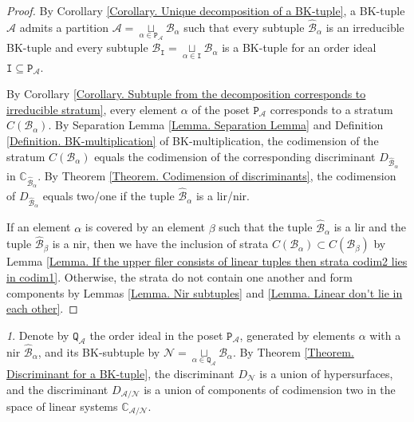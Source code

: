 \documentclass[11pt]{article}
\theoremstyle{plain}
\theoremstyle{definition}
\theoremstyle{remark}
\newtheorem{rem}[thm]{\protect\remarkname}
\theoremstyle{plain}
\theoremstyle{plain}
\theoremstyle{plain}
\theoremstyle{definition}
\providecommand{\remarkname}{Remark}
\begin{document}
\begin{proof}
By Corollary \ref{Corollary. Unique decomposition of a BK-tuple},
a BK-tuple $\mathscr{A}$ admits a partition $\mathscr{A}=\underset{\alpha\in\mathtt{P}_{\mathscr{A}}}{\sqcup}\mathscr{B}_{\alpha}$
such that every subtuple $\hat{\mathscr{B}}_{\alpha}$ is an irreducible
BK-tuple and every subtuple $\mathscr{B}_{\mathtt{I}}=\underset{\alpha\in\mathtt{I}}{\sqcup}\mathscr{B}_{\alpha}$
is a BK-tuple for an order ideal $\mathtt{I}\subseteq\mathtt{P}_{\mathscr{A}}$. 

By Corollary \ref{Corollary. Subtuple from the decomposition corresponds to irreducible stratum},
every element $\alpha$ of the poset $\mathtt{P}_{\mathscr{A}}$ corresponds
to a stratum $C(\mathscr{B}_{\alpha}).$ By Separation Lemma \ref{Lemma. Separation Lemma}
and Definition \ref{Definition. BK-multiplication} of BK-multiplication,
the codimension of the stratum $C(\mathscr{B}_{\alpha})$ equals the
codimension of the corresponding discriminant $D_{\hat{\mathscr{B}}_{\alpha}}$
in $\mathbb{C}_{\hat{\mathscr{B}}_{\alpha}}$. By Theorem \ref{Theorem. Codimension of discriminants},
the codimension of $D_{\hat{\mathscr{B}}_{\alpha}}$ equals two/one
if the tuple $\hat{\mathscr{B}}_{\alpha}$ is a lir/nir.

If an element $\alpha$ is covered by an element $\beta$ such that
the tuple $\hat{\mathscr{B}}_{\alpha}$ is a lir and the tuple $\hat{\mathscr{B}}_{\beta}$
is a nir, then we have the inclusion of strata $C(\mathscr{B}_{\alpha})\subset C(\mathscr{B}_{\beta})$
by Lemma \ref{Lemma. If the upper filer consists of linear tuples then strata codim2 lies in codim1}.
Otherwise, the strata do not contain one another and form components
by Lemmas \ref{Lemma. Nir subtuples} and \ref{Lemma. Linear don't lie in each other}.
\end{proof}
\begin{rem}
Denote by $\mathtt{Q}_{\mathscr{A}}$ the order ideal in the poset
$\mathtt{P}_{\mathscr{A}}$, generated by elements $\alpha$ with
a nir $\hat{\mathscr{B}}_{\alpha}$, and its BK-subtuple by $\mathscr{N}=\underset{\alpha\in\mathtt{Q}_{\mathscr{A}}}{\sqcup}\mathscr{B}_{\alpha}$.
By Theorem \ref{Theorem. Discriminant for a BK-tuple}, the discriminant
$D_{\mathscr{N}}$ is a union of hypersurfaces, and the discriminant
$D_{\mathscr{A}/\mathscr{N}}$ is a union of components of codimension
two in the space of linear systems $\mathbb{C}_{\mathscr{A}/\mathscr{N}}$.
\end{rem}
\end{document}
